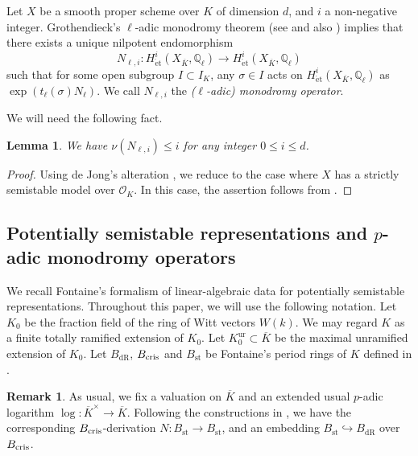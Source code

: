 \documentclass[12pt,reqno]{amsart}
\newtheorem{lem}[thm]{Lemma}
\theoremstyle{definition}
\newtheorem{rem}[thm]{Remark}
\newcommand{\Q}{{\mathds Q}}
\newcommand\cris{\text{\rm cris}}
\newcommand\dR{\mathop{\mathrm{dR}}}
\newcommand{\et}{\mathrm{\acute{e}t}}
\DeclareMathOperator{\st}{st}
\DeclareMathOperator{\ur}{ur}
\numberwithin{equation}{section}
\begin{document}
Let $X$ be a smooth proper scheme over $K$ of dimension $d$, and $i$ a non-negative integer.
Grothendieck's $\ell$-adic monodromy theorem (see \cite[Expos\'e I, Variante 1.3]{SGA7-I} and also \cite[Appendix]{Serre-Tate68}) implies that
there exists a unique nilpotent endomorphism
\[
N_{\ell, i} \colon H^i_\et(X_{\overline{K}}, \Q_\ell) \to H^i_\et(X_{\overline{K}}, \Q_\ell)
\]
such that for some open subgroup $I \subset I_K$, any $\sigma \in I$ acts on $H^i_\et(X_{\overline{K}}, \Q_\ell)$
as $\exp (t_{\ell} (\sigma) N_{\ell})$.
We call $N_{\ell, i}$ the \textit{($\ell$-adic) monodromy operator}.

We will need the following fact.

\begin{lem}\label{Lemma:ell adic nilpotency index upper bound in general}
    We have $\nu(N_{\ell, i}) \leq i$ for any integer $0 \leq i \leq d$.
\end{lem}

\begin{proof}
    Using de Jong's alteration \cite[Theorem 6.5]{deJong96}, we reduce to the case where $X$ has a strictly semistable model over $\mathcal{O}_K$.
    In this case, the assertion follows from \cite[Expos\'e I, Corollaire 3.4]{SGA7-I}.
\end{proof}


\subsection{Potentially semistable representations and $p$-adic monodromy operators}
\label{Subsection:Potentially semistable representations and p adic monodromy operators}

We recall Fontaine's formalism of linear-algebraic data for potentially semistable representations.
Throughout this paper, we will use the following notation.
Let $K_0$ be the fraction field of the ring of Witt vectors $W(k)$.
We may regard $K$ as a finite totally ramified extension of $K_0$.
Let $K_0^{\ur} \subset \overline{K}$ be the maximal unramified extension of $K_0$.
Let $B_{\dR}$, $B_{\cris}$ and $B_{\st}$ be Fontaine's period rings of $K$ {defined in \cite{Fontaine94II}}.

\begin{rem}\label{Remark: some choices for Bst}
As usual, we fix a valuation on $\overline{K}$ and an extended usual $p$-adic logarithm $\log \colon \overline{K}^\times \to \overline{K}$.
Following the constructions in 
\cite{Fontaine94II}, we have the corresponding
$B_{\cris}$-derivation $N \colon B_{\st} \to B_{\st}$, and an embedding $B_{\st} \hookrightarrow B_{\dR}$ over $B_{\cris}$.
\end{rem}
\end{document}
